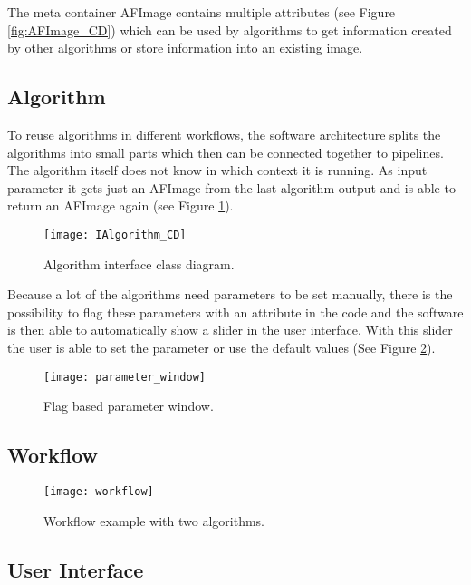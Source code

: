 The meta container AFImage contains multiple attributes (see Figure \ref{fig:AFImage_CD}) which can be used by algorithms to get information created by other algorithms or store information into an existing image.

\subsection{Algorithm}
To reuse algorithms in different workflows, the software architecture splits the algorithms into small parts which then can be connected together to pipelines. The algorithm itself does not know in which context it is running. As input parameter it gets just an AFImage from the last algorithm output and is able to return an AFImage again (see Figure \ref{fig:IAlgorithm_CD}). 

\begin{figure}[h]
  \centering
      \texttt{[image: IAlgorithm\_CD]}
  \caption{Algorithm interface class diagram.}
  \label{fig:IAlgorithm_CD}
\end{figure}

Because a lot of the algorithms need parameters to be set manually, there is the possibility to flag these parameters with an attribute in the code and the software is then able to automatically show a slider in the user interface. With this slider the user is able to set the parameter or use the default values (See Figure \ref{fig:parameter_window}).


\begin{figure}[h]
  \centering
      \texttt{[image: parameter\_window]}
  \caption{Flag based parameter window.}
  \label{fig:parameter_window}
\end{figure}


\subsection{Workflow}

\begin{figure}[h]
  \centering
      \texttt{[image: workflow]}
  \caption{Workflow example with two algorithms.}
  \label{fig:Workflow}
\end{figure}

\subsection{User Interface}
